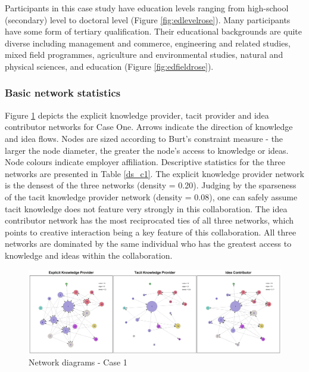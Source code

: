 Participants in this case study have education levels ranging from high-school (secondary) level to doctoral level (Figure \ref{fig:edlevelrose}). Many participants have some form of tertiary qualification. Their educational backgrounds are quite diverse including management and commerce, engineering and related studies, mixed field programmes, agriculture and environmental studies, natural and physical sciences, and education (Figure \ref{fig:edfieldrose}). 

\subsubsection{Basic network statistics}

Figure \ref{fig:thesisnetworkscase1} depicts the explicit knowledge provider, tacit  provider and idea contributor networks for Case One. Arrows indicate the direction of knowledge and idea flows. Nodes are sized according to Burt's constraint measure - the larger the node diameter, the greater the node's access to knowledge or ideas. Node colours indicate employer affiliation. Descriptive statistics for the three networks are presented in Table \ref{ds_c1}. The explicit knowledge provider network is the densest of the three networks (density = 0.20). Judging by the sparseness of the tacit knowledge provider network (density = 0.08), one can safely assume tacit knowledge does not feature very strongly in this collaboration. The idea contributor network has the most reciprocated ties of all three networks, which points to creative interaction being a key feature of this collaboration. All three networks are dominated by the same individual who has the greatest access to knowledge and ideas within the collaboration.\medskip

\begin{landscape}
	\begin{figure}
		\centering
		\includegraphics[width=1.0\linewidth]{Images/thesis_networks_case1}
		\caption{Network diagrams - Case 1}
		\label{fig:thesisnetworkscase1}
	\end{figure}
\end{landscape}


